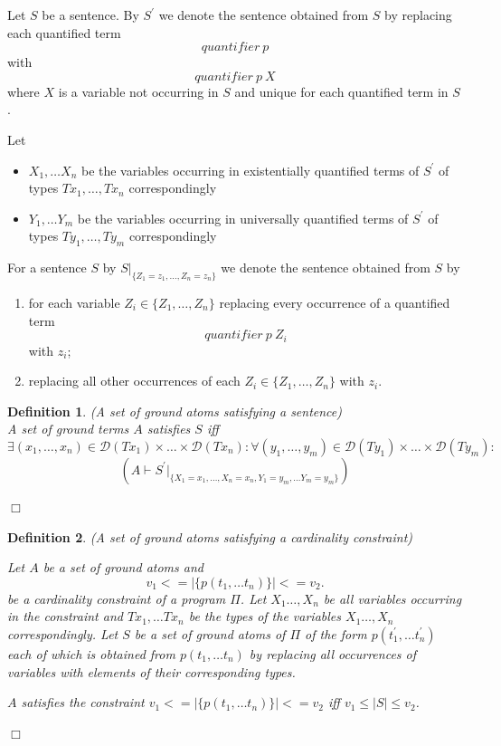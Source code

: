 \documentclass[a4paper,10pt]{article}
\newtheorem{definition}{Definition}
\begin{document}
\noindent\medskip
Let $S$ be a sentence. By $S^\prime$ we denote the sentence obtained from $S$ by replacing each  quantified term 
$$quantifier~p $$
with $$ quantifier~p~X$$
 where $X$ is a variable not occurring in $S$ and unique for each quantified term in $S$.

\noindent\medskip
Let
\begin{itemize}
\item $X_1,\ldots X_n$ be the variables occurring in existentially quantified terms of $S^\prime$ of types $Tx_1,\ldots, Tx_n$ correspondingly
\item $Y_1, \ldots Y_m$ be the variables occurring in universally quantified terms of $S^\prime$ of types $Ty_1, \ldots, Ty_m$ correspondingly
\end{itemize}

\noindent\medskip
For a sentence $S$ by $S|_{\{Z_1 = z_1, \ldots, Z_n = z_n\}}$ we denote the sentence obtained from $S$ by 
\begin{enumerate}
\item for each variable $Z_i \in \{Z_1,\ldots, Z_n\}$ replacing every occurrence of a quantified term 
$$ quantifier~p~Z_i$$ with $z_i$;
\item replacing all other occurrences of each $Z_i \in  \{Z_1,\ldots, Z_n\}$ with $z_i$.
\end{enumerate}

\begin{definition}(A set of ground atoms satisfying a sentence)\\
\rm{
   A set of ground terms $A$ satisfies  $S$ iff
  $$ \exists (x_1,\ldots,x_n)  \in \mathcal{D}(Tx_1) \times \ldots \times \mathcal{D}(Tx_n): 
\forall (y_1,\ldots,y_m) \in  \mathcal{D}(Ty_1) \times \ldots \times \mathcal{D}(Ty_m):$$ $$(A \vdash S^\prime|_{\{X_1 = x_1, \ldots, X_n = x_n, Y_1 = y_m,\ldots Y_m = y_m\}})$$
}

\hfill$\Box$
\end{definition}

\begin{definition}(A set of ground atoms satisfying a cardinality constraint)\\
\rm{
Let $A$ be a set of ground atoms and $$v_1 <= |\{p(t_1,\ldots t_n)\}| <= v_2.$$ be a cardinality constraint of a program $\Pi$.
Let $X_1\ldots,X_n$ be all variables occurring in the constraint and $Tx_1,\ldots Tx_n$ be the types of the variables $X_1\ldots,X_n$ correspondingly. Let $S$ be a set of ground atoms of $\Pi$ of the form $p(t_1^\prime,\ldots t_n^\prime)$ each of which is obtained from $p(t_1,\ldots t_n)$ by replacing all occurrences of variables  with elements of their corresponding types.

\noindent\medskip
$A$ satisfies  the constraint $v_1 <= |\{p(t_1,\ldots t_n)\}| <= v_2$ iff $v_1 \le |S| \le v_2$. 

\hfill$\Box$

}
\end{definition}
\end{document}
